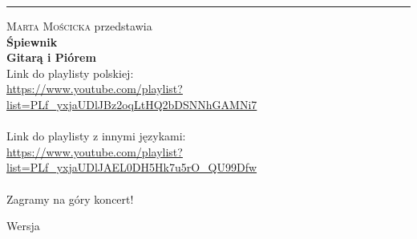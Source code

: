 \documentclass[12pt,a4paper,titlepage,openany]{book}
\begin{document}

\begin{titlepage} %
	\raggedleft %
	
	\rule{1pt}{\textheight} %
	\hspace{0.05\textwidth} %
	\parbox[b]{0.75\textwidth}{ %
		
		{\textsc{Marta Mościcka} przedstawia}
		\\[2\baselineskip] 		
		{\Huge\bfseries Śpiewnik \\[0.5\baselineskip] Gitarą i Piórem}
		\\[14\baselineskip] 		
		{
		Link do playlisty polskiej:\\
		{\small \url{https://www.youtube.com/playlist?list=PLf_yxjaUDlJBz2oqLtHQ2bDSNNhGAMNi7}}\\
		\\
		Link do playlisty z innymi językami:\\
		{\small \url{https://www.youtube.com/playlist?list=PLf_yxjaUDlJAEL0DH5Hk7u5rO_QU99Dfw}}\\
		\\
		Zagramy na góry koncert!}	
		
		\begin{flushright}
		Wersja~~
		\end{flushright}
	}
\end{titlepage}
\raggedbottom
\pagestyle{plain}

\tableofcontents

\end{document}
